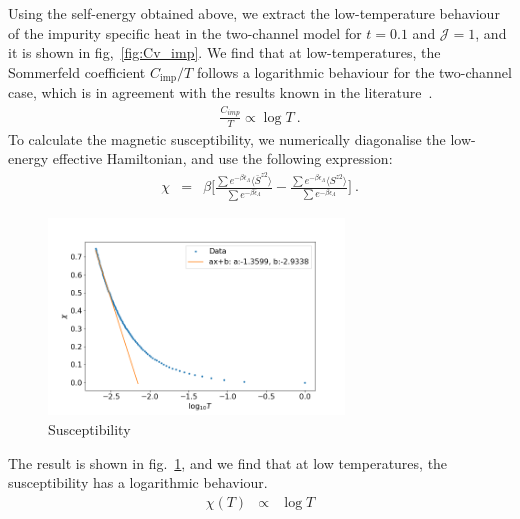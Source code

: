 \documentclass[reprint,onecolumn,prb,superscriptaddress]{revtex4-2}
\begin{document}
Using the self-energy obtained above, we extract the low-temperature behaviour of the impurity specific heat in the two-channel model for $t=0.1$ and $\mathcal{J}=1$, and it is shown in fig,~\ref{fig:Cv_imp}. We find that at low-temperatures, the Sommerfeld coefficient \(C_\text{imp}/T\) follows a logarithmic behaviour for the two-channel case, which is in agreement with the results known in the literature~\cite{affleck_1991_overscreen,affleck_ludwig_1991,affleck_pang_cox_1992,affleck1993exact,
parcollet_olivier_large_N,affleck_2005,emery_kivelson,clarke_giamarchi_1993,zarand_2000,
vondelft_prl_1998,schofield_1997,bullaNRGreview,affleck_pang_cox_1992,pang_cox_1991,
andrei_destri_1984,Tsvelick1984,Tsvelick_1985,andrei_jerez_1995,zarand_costi_2002,
sengupta_1994,fabrizio_nozieres_1995,Coleman_tsvelik,fabrizio_gogolin_1995}.
\begin{eqnarray}
\frac{C_{imp}}{T} \propto \log T~.
\end{eqnarray}
To calculate the magnetic susceptibility, we numerically diagonalise the low-energy effective Hamiltonian, and use the following expression:
\begin{eqnarray}
\chi &=& \beta\bigg[\frac{\sum e^{-\beta \bar{\epsilon}_{\Lambda}} \langle \bar{S}^{z2} \rangle}{\sum e^{-\beta \bar{\epsilon}_{\Lambda}} } -\frac{\sum e^{-\beta \epsilon_{\Lambda}} \langle S^{z2 }\rangle }{\sum e^{-\beta \epsilon_{\Lambda}} } \bigg] ~.
\end{eqnarray}
\begin{figure}[!htb]
\centering
\includegraphics[width=0.7\textwidth]{plt/NFLChilog0p1}
\caption{Susceptibility}
\label{fig:NFL_susecptibility}
\end{figure}
The result is shown in fig.~\ref{fig:NFL_susecptibility}, and we find that at low temperatures, the susceptibility has a logarithmic behaviour.
\begin{eqnarray}
\chi(T) &\propto& \log T
\end{eqnarray}
\end{document}
